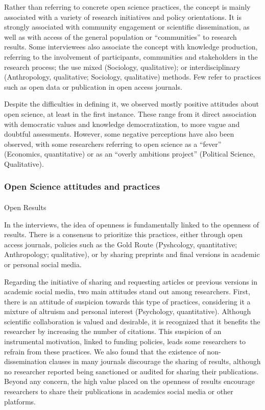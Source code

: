 \documentclass[
  english,
  letterpaper,
]{article}
\makeatletter
\let\oldparagraph\paragraph
\renewcommand{\paragraph}{
    \@ifstar
      \xxxParagraphStar
      \xxxParagraphNoStar
  }
\newcommand{\xxxParagraphStar}[1]{\oldparagraph*{#1}\mbox{}}
\newcommand{\xxxParagraphNoStar}[1]{\oldparagraph{#1}\mbox{}}
\makeatother
\begin{document}
Rather than referring to concrete open science practices, the concept is
mainly associated with a variety of research initiatives and policy
orientations. It is strongly associated with community engagement or
scientific dissemination, as well as with access of the general
population or ``communities'' to research results. Some interviewees
also associate the concept with knowledge production, referring to the
involvement of participants, communities and stakeholders in the
research process; the use mixed (Sociology, qualitative); or
interdisciplinary (Anthropology, qualitative; Sociology, qualitative)
methods. Few refer to practices such as open data or publication in open
access journals.

Despite the difficulties in defining it, we observed mostly positive
attitudes about open science, at least in the first instance. These
range from it direct association with democratic values and knowledge
democratization, to more vague and doubtful assessments. However, some
negative perceptions have also been observed, with some researchers
referring to open science as a ``fever'' (Economics, quantitative) or as
an ``overly ambitions project'' (Political Science, Qualitative).

\subsubsection{\texorpdfstring{\textbf{Open Science attitudes and
practices}}{Open Science attitudes and practices}}\label{open-science-attitudes-and-practices}

\paragraph{Open Results}\label{open-results}

In the interviews, the idea of openness is fundamentally linked to the
openness of results. There is a consensus to prioritize this practices,
either through open access journals, policies such as the Gold Route
(Pyshcology, quantitative; Anthropology; qualitative), or by sharing
preprints and final versions in academic or personal social media.

Regarding the initiative of sharing and requesting articles or previous
versions in academic social media, two main attitudes stand out among
researchers. First, there is an attitude of suspicion towards this type
of practices, considering it a mixture of altruism and personal interest
(Psychology, quantitative). Although scientific collaboration is valued
and desirable, it is recognized that it benefits the researcher by
increasing the number of citations. This suspicion of an instrumental
motivation, linked to funding policies, leads some researchers to
refrain from these practices. We also found that the existence of
non-dissemination clauses in many journals discourage the sharing of
results, although no researcher reported being sanctioned or audited for
sharing their publications. Beyond any concern, the high value placed on
the openness of results encourage researchers to share their
publications in academics social media or other platforms.
\end{document}
